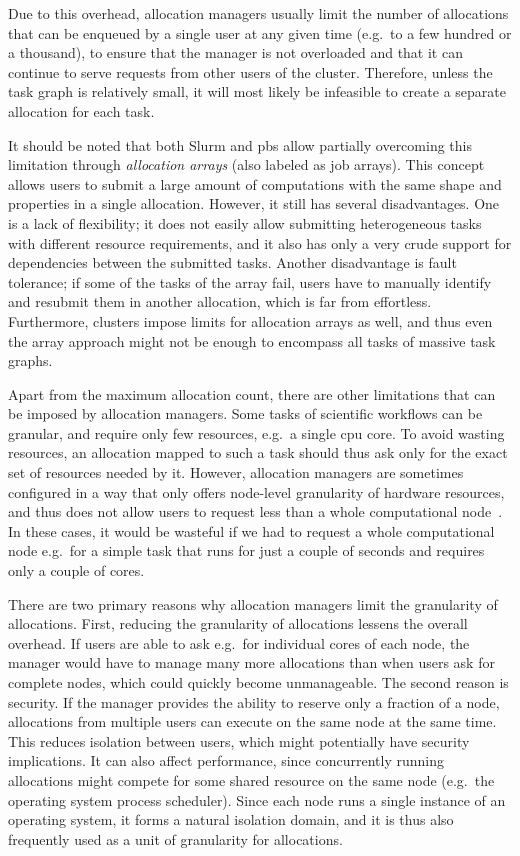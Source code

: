 Due to this overhead, allocation managers usually limit the number of allocations that can be
enqueued by a single user at any given time (e.g.\ to a few hundred or a thousand), to ensure that
the manager is not overloaded and that it can continue to serve requests from other users of the
cluster. Therefore, unless the task graph is relatively small, it will most likely be infeasible to
create a separate allocation for each task.

It should be noted that both Slurm and \gls{pbs} allow partially overcoming this
limitation through \emph{allocation arrays} (also labeled as job arrays). This concept allows users to submit a large amount of
computations with the same shape and properties in a single allocation. However, it still has
several disadvantages. One is a lack of flexibility; it does not easily allow submitting
heterogeneous tasks with different resource requirements, and it also has only a very crude support
for dependencies between the submitted tasks. Another disadvantage is fault tolerance; if some of
the tasks of the array fail, users have to manually identify and resubmit them in another
allocation, which is far from effortless. Furthermore, clusters impose limits for allocation arrays
as well, and thus even the array approach might not be enough to encompass all tasks of massive
task graphs.

Apart from the maximum allocation count, there are other limitations that can be imposed by
allocation managers. Some tasks of scientific workflows can be granular, and require only few
resources, e.g.\ a single \gls{cpu} core. To avoid wasting resources, an
allocation mapped to such a task should thus ask only for the exact set of resources needed by it.
However, allocation managers are sometimes configured in a way that only offers node-level
granularity of hardware resources, and thus does not allow users to request less than a whole
computational node~\cite{it4i_node_scheduling_policy}. In these cases, it would be wasteful if we had to
request a whole computational node e.g.\ for a simple task that runs for just a couple of seconds and
requires only a couple of cores.

There are two primary reasons why allocation managers limit the granularity of allocations. First,
reducing the granularity of allocations lessens the overall overhead. If users are able to ask
e.g.\ for individual cores of each node, the manager would have to manage many more allocations
than when users ask for complete nodes, which could quickly become unmanageable. The second reason
is security. If the manager provides the ability to reserve only a fraction of a node, allocations
from multiple users can execute on the same node at the same time. This reduces isolation between
users, which might potentially have security implications. It can also affect performance, since
concurrently running allocations might compete for some shared resource on the same node (e.g.\ the
operating system process scheduler). Since each node runs a single instance of an operating system,
it forms a natural isolation domain, and it is thus also frequently used as a unit of granularity
for allocations.

